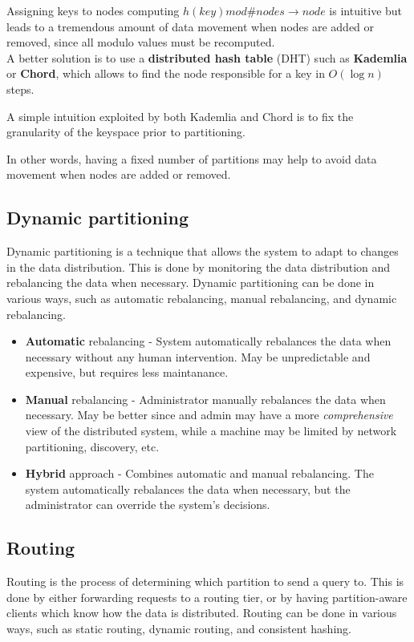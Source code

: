 Assigning keys to nodes computing $h(key) mod \#{nodes} \rightarrow node$ is intuitive but leads to a tremendous amount of data movement when nodes are added or removed, since all modulo values must be recomputed.\\
A better solution is to use a \textbf{distributed hash table} (DHT) such as \textbf{Kademlia} or \textbf{Chord}, which allows to find the node responsible for a key in $O(\log n)$ steps.

A simple intuition exploited by both Kademlia and Chord is to fix the granularity of the keyspace prior to partitioning.

In other words, having a fixed number of partitions may help to avoid data movement when nodes are added or removed.


\subsection{Dynamic partitioning}
Dynamic partitioning is a technique that allows the system to adapt to changes in the data distribution. This is done by monitoring the data distribution and rebalancing the data when necessary. Dynamic partitioning can be done in various ways, such as automatic rebalancing, manual rebalancing, and dynamic rebalancing.

\begin{itemize}
   \item \textbf{Automatic} rebalancing - System automatically rebalances the data when necessary without any human intervention.
   May be unpredictable and expensive, but requires less maintanance.
   \item \textbf{Manual} rebalancing - Administrator manually rebalances the data when necessary. May be better since and admin may have a more \textit{comprehensive} view of the distributed system, while a machine may be limited by network partitioning, discovery, etc.
   \item \textbf{Hybrid} approach - Combines automatic and manual rebalancing. The system automatically rebalances the data when necessary, but the administrator can override the system's decisions. 
\end{itemize}

\subsection{Routing}
Routing is the process of determining which partition to send a query to. This is done by either forwarding requests to a routing tier, or by having partition-aware clients which know how the data is distributed. Routing can be done in various ways, such as static routing, dynamic routing, and consistent hashing.



